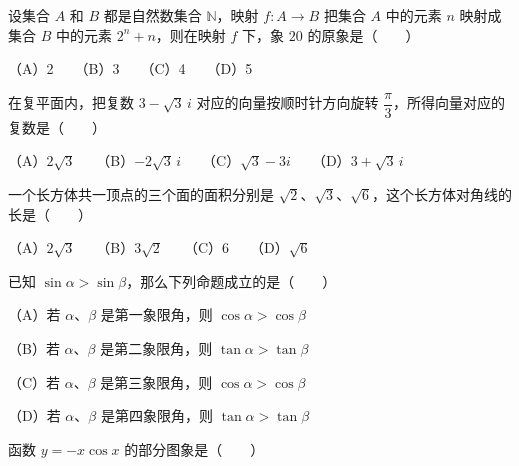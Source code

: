 \begin{question}
设集合 $A$ 和 $B$ 都是自然数集合 $\mathbb N$，映射 $f:A\to B$ 把集合 $A$ 中的元素 $n$ 映射成集合 $B$ 中的元素 $2^n+n$，则在映射 $f$ 下，象 $20$ 的原象是\mbox{（　　）}

（A）2　　（B）3　　（C）4　　（D）5

\end{question}
\begin{question}
在复平面内，把复数 $3-\sqrt3\,i$ 对应的向量按顺时针方向旋转 $\dfrac\pi3$，所得向量对应的复数是\mbox{（　　）}

（A）$2\sqrt3$　　（B）$-2\sqrt3\,i$　　（C）$\sqrt3-3i$　　（D）$3+\sqrt3\,i$

\end{question}
\begin{question}
一个长方体共一顶点的三个面的面积分别是 $\sqrt2$、$\sqrt3$、$\sqrt6$，这个长方体对角线的长是\mbox{（　　）}

（A）$2\sqrt3$　　（B）$3\sqrt2$　　（C）6　　（D）$\sqrt6$

\end{question}
\begin{question}
已知 $\sin\alpha>\sin\beta$，那么下列命题成立的是\mbox{（　　）}

（A）若 $\alpha$、$\beta$ 是第一象限角，则 $\cos\alpha>\cos\beta$

（B）若 $\alpha$、$\beta$ 是第二象限角，则 $\tan\alpha>\tan\beta$

（C）若 $\alpha$、$\beta$ 是第三象限角，则 $\cos\alpha>\cos\beta$

（D）若 $\alpha$、$\beta$ 是第四象限角，则 $\tan\alpha>\tan\beta$

\Needspace{0.4\textheight}
\end{question}
\begin{question}
函数 $y=-x\cos x$ 的部分图象是\mbox{（　　）}
\nopagebreak[4]
\begin{center}\end{center}
\nopagebreak[4]
\end{question}
